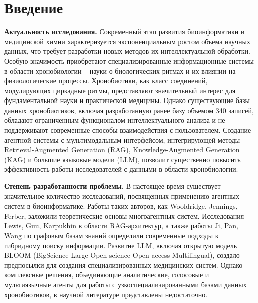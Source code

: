 \documentclass[a4paper,14pt]{extarticle}
\begin{document}
	\setcounter{page}{2}
	\tableofcontents
	\newpage
	
	\section*{Введение}
	
	\textbf{Актуальность исследования.} Современный этап развития биоинформатики и медицинской химии характеризуется экспоненциальным ростом объема научных данных, что требует разработки новых методов их интеллектуальной обработки. Особую значимость приобретают специализированные информационные системы в области хронобиологии – науки о биологических ритмах и их влиянии на физиологические процессы. Хронобиотики, как класс соединений, модулирующих циркадные ритмы, представляют значительный интерес для фундаментальной науки и практической медицины. Однако существующие базы данных хронобиотиков, включая разработанную ранее базу объемом 340 записей, обладают ограниченным функционалом интеллектуального анализа и не поддерживают современные способы взаимодействия с пользователем. Создание агентной системы с мультимодальным интерфейсом, интегрирующей методы Retrieval-Augmented Generation (RAG), Knowledge-Augmented Generation (KAG) и большие языковые модели (LLM), позволит существенно повысить эффективность работы исследователей с данными в области хронобиологии.
	
	\textbf{Степень разработанности проблемы.} В настоящее время существует значительное количество исследований, посвященных применению агентных систем в биоинформатике. Работы таких авторов, как Wooldridge, Jennings, Ferber, заложили теоретические основы многоагентных систем. Исследования Lewis, Guu, Karpukhin в области RAG-архитектур, а также работы Ji, Pan, Wang по графовым базам знаний определили современные подходы к гибридному поиску информации. Развитие LLM, включая открытую модель BLOOM (BigScience Large Open-science Open-access Multilingual), создало предпосылки для создания специализированных медицинских систем. Однако комплексные решения, объединяющие аналитические, голосовые и мультиязычные агенты для работы с узкоспециализированными базами данных хронобиотиков, в научной литературе представлены недостаточно.
	
\end{document}
